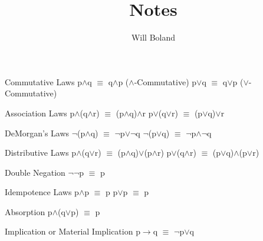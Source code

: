 \documentclass{article}
\begin{document}
\title{Notes}
\author{Will Boland}
\maketitle

Commutative Laws\newline
p$\wedge$q $\equiv$ q$\wedge$p ($\wedge$-Commutative)\newline
p$\lor$q $\equiv$ q$\lor$p ($\lor$-Commutative)\newline\newline

Association Laws\newline
p$\wedge$(q$\wedge$r) $\equiv$ (p$\wedge$q)$\wedge$r\newline
p$\lor$(q$\lor$r) $\equiv$ (p$\lor$q)$\lor$r\newline\newline

DeMorgan's Laws\newline
$\neg$(p$\wedge$q) $\equiv$ $\neg$p$\lor$$\neg$q\newline
$\neg$(p$\lor$q) $\equiv$ $\neg$p$\wedge$$\neg$q\newline\newline

Distributive Laws\newline
p$\wedge$(q$\lor$r) $\equiv$ (p$\wedge$q)$\lor$(p$\wedge$r)\newline
p$\lor$(q$\wedge$r) $\equiv$ (p$\lor$q)$\wedge$(p$\lor$r)\newline\newline

Double Negation\newline
$\neg$$\neg$p $\equiv$ p \newline\newline

Idempotence Laws\newline
p$\wedge$p $\equiv$ p\newline
p$\lor$p $\equiv$ p\newline\newline

Absorption\newline
p$\wedge$(q$\lor$p) $\equiv$ p\newline\newline

Implication or Material Implication\newline
p$\rightarrow$q $\equiv$ $\neg$p$\lor$q\newline\newline
\end{document}
